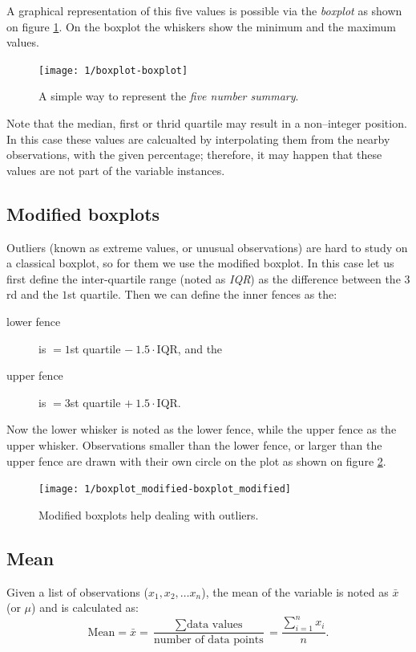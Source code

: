 A graphical representation of this five values is possible via the
\emph{boxplot} as shown on figure \ref{fig:boxplot}. On the boxplot the whiskers
show the minimum and the maximum values.

\begin{figure}[htbp]
\label{fig:boxplot}
\caption{A simple way to represent the \emph{five number summary}.}
\texttt{[image: 1/boxplot-boxplot]}
\end{figure}

Note that the median, first or thrid quartile may result in a non--integer
position. In this case these values are calcualted by interpolating them from
the nearby observations, with the given percentage; therefore, it may happen that
these values are not part of the variable instances.

\subsection{Modified boxplots}
Outliers (known as extreme values, or unusual observations) are hard
to study on a classical boxplot, so for them we use the modified boxplot. In
this case let us first define the inter-quartile range (noted as \emph{IQR}) as
the difference between the $3$rd and the $1$st quartile. Then we can define the
inner fences as the:

\begin{description}
  \item[lower fence]  is $=1$st quartile $- ~1.5\cdot $IQR, and the  
  \item[upper fence]  is $=3$st quartile $+ ~1.5\cdot $IQR.  
\end{description}

Now the lower whisker is noted as the lower fence, while the upper fence as the
upper whisker. Observations smaller than the lower fence, or larger than the
upper fence are drawn with their own circle on the plot as shown on figure
\ref{fig:boxplot_modified}.

\begin{figure}[htbp]
\label{fig:boxplot_modified}
\caption{Modified boxplots help dealing with outliers.}
\texttt{[image: 1/boxplot\_modified-boxplot\_modified]}
\end{figure}

\subsection{Mean}
Given a list of observations ($x_1, x_2, \ldots x_n$), the mean of the variable
is noted as $\bar{x}$ (or $\mu$) and is calculated as: 
\[ \mbox{Mean} = \bar{x} = 
\frac{\sum{\mbox{data values}}}{\mbox{number of data points}} =
\frac{\sum_{i=1}^{n}{x_i}}{n}.
\]


